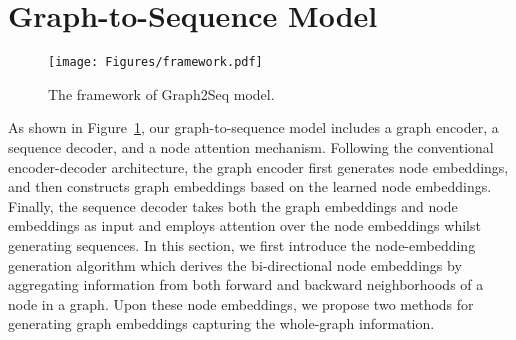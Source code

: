 \documentclass{article} \usepackage{iclr2019_conference,times}
\begin{document}
\section{Graph-to-Sequence Model}
\begin{figure}[t!]
\centering\texttt{[image: Figures/framework.pdf]}
\caption{The framework of Graph2Seq model.}
\label{fig:framework}
\vspace{-0.5cm}
\end{figure}

As shown in Figure~\ref{fig:framework}, our graph-to-sequence model includes a graph encoder, a sequence decoder, and
a node attention mechanism.
Following the conventional encoder-decoder architecture, the graph encoder first generates
node embeddings, and then constructs graph embeddings based on the learned node embeddings.
Finally, the sequence decoder takes both the graph embeddings and node embeddings as input and employs attention over the node embeddings whilst generating sequences.
In this section, we first introduce the node-embedding generation algorithm which derives the bi-directional node embeddings by aggregating information from both forward and backward neighborhoods of a node in a graph. Upon these node embeddings, we propose two methods for generating graph embeddings capturing the whole-graph information.
\end{document}

